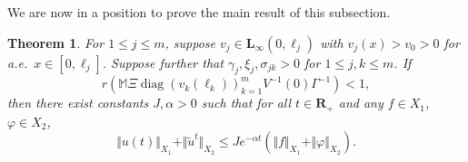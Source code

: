 \documentclass[a4paper,11pt,reqno]{amsart}
\def\R{\mathbf{R}}
\newtheorem{theorem}{Theorem}[section]
\theoremstyle{plain}
\numberwithin{equation}{section}
\begin{document}
We are now in a position to prove the main result of this subsection.
\begin{theorem}\label{stab-trp-sys}
For $1\le j\le m$, suppose $v_j\in {\bm L}_\infty(0,\ell_j)$ with $v_j(x)>v_0>0$ for a.e.\ $x\in [0,\ell_j]$. Suppose further that $\gamma_j,\xi_j,\sigma_{jk}>0$ for $1\le j,k\le m$. If
\begin{equation}\label{stability-condition}
r(\mathbb{M}\Xi \operatorname{diag}(v_k(\ell_{k}))_{k=1}^m V^{-1}(0)\Gamma^{-1})<1,
\end{equation}
then there exist constants $J,\alpha>0$ such that for all $t\in\R_+$ and any $f\in X_1$, $\varphi\in X_2$,
\begin{equation}\label{solution-decay}
\Vert u(t)\Vert_{X_1}+\Vert \tilde{u}^t\Vert_{X_2}\le J e^{-\alpha t}\left(\Vert f\Vert_{X_1}+\Vert \varphi\Vert_{X_2}\right).
\end{equation}
\end{theorem}
\end{document}
